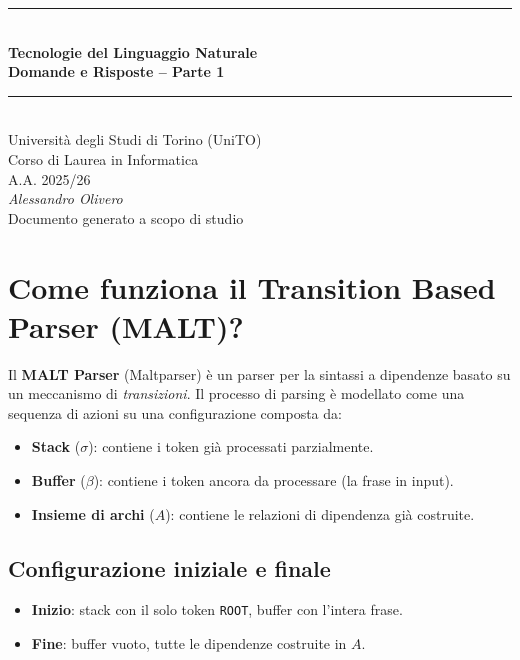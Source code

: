 \documentclass[12pt,a4paper]{article}
\begin{document}
\begin{titlepage}
  \centering
  \vspace*{2cm}
  {\color{primary}\rule{\linewidth}{2pt}}\\[0.5cm]
  {\Huge\bfseries\color{primary} Tecnologie del Linguaggio Naturale}\\[0.4cm]
  {\Large\bfseries\color{darkgray} Domande e Risposte -- Parte 1}\\[0.3cm]
  {\color{primary}\rule{\linewidth}{2pt}}\\[1cm]
  {\large Università degli Studi di Torino (UniTO)}\\[0.2cm]
  {\large Corso di Laurea in Informatica}\\[0.2cm]
  {\large A.A. 2025/26}\\[2cm]
  {\large\itshape Alessandro Olivero}\\[4cm]
  {\small\color{darkgray} Documento generato a scopo di studio}
  \vfill
\end{titlepage}

\tableofcontents
\newpage

\section{Come funziona il Transition Based Parser (MALT)?}

Il \textbf{MALT Parser} (Maltparser) è un parser per la sintassi a dipendenze basato su un meccanismo di \emph{transizioni}. Il processo di parsing è modellato come una sequenza di azioni su una configurazione composta da:

\begin{itemize}[leftmargin=1.5em]
  \item \textbf{Stack} ($\sigma$): contiene i token già processati parzialmente.
  \item \textbf{Buffer} ($\beta$): contiene i token ancora da processare (la frase in input).
  \item \textbf{Insieme di archi} ($A$): contiene le relazioni di dipendenza già costruite.
\end{itemize}

\subsection{Configurazione iniziale e finale}
\begin{itemize}[leftmargin=1.5em]
  \item \textbf{Inizio}: stack con il solo token \texttt{ROOT}, buffer con l'intera frase.
  \item \textbf{Fine}: buffer vuoto, tutte le dipendenze costruite in $A$.
\end{itemize}
\end{document}
